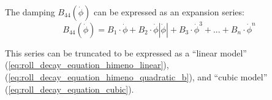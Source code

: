 The damping $B_{44}\left(\dot{\phi}\right)$ can be expressed as an expansion series:  
\begin{equation}
    B_{44}\left(\dot{\phi}\right) = B_1\cdot\dot{\phi} + B_2\cdot\dot{\phi}\left|\dot{\phi}\right| + B_3\cdot\dot{\phi}^3 + ... + B_n\cdot\dot{\phi}^n
\end{equation}
 
\noindent This series can be truncated to be expressed as a ``linear model'' (\autoref{eq:roll_decay_equation_himeno_linear}),  (\autoref{eq:roll_decay_equation_himeno_quadratic_b}), and ``cubic model'' (\autoref{eq:roll_decay_equation_cubic}).



%